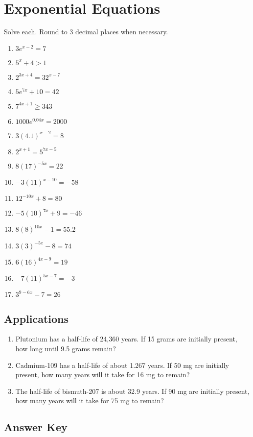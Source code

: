 \chapter{Exponential Equations}

Solve each. Round to 3 decimal places when necessary.
\begin{multicols}{2}
\begin{enumerate}
	\item $3e^{x-2} = 7$
	\item $5^x + 4 > 1$
	\item $2^{3x+4} = 32^{x-7}$
	\item $5e^{7x} + 10 = 42$
	\item $7^{4x+1} \geq 343$
	\item $1000e^{0.04x} = 2000$
	\item $3(4.1)^{x-2} = 8$
	\item $2^{x+1} = 5^{7x-5}$
	\item $8(17)^{-5x} = 22$
	\item $-3(11)^{x-10} = -58$
	\item $12^{-10x}+8=80$
	\item $-5(10)^{7x}+9 = -46$
	\item $8(8)^{10x}-1 = 55.2$
	\item $3(3)^{-5x}-8=74$
	\item $6(16)^{4x-9} = 19$
	\item $-7(11)^{5x-7}=-3$
	\item $3^{9-6x}-7 = 26$
\end{enumerate}
\end{multicols}

\section{Applications}
\begin{enumerate}
	\item Plutonium has a half-life of 24,360 years. If 15 grams are initially present, how long until 9.5 grams remain?
	\item Cadmium-109 has a half-life of about 1.267 years. If 50 mg are initially present, how many years will it take for 16 mg to remain?
    \item The half-life of bismuth-207 is about 32.9 years. If 90 mg are initially present, how many years will it take for 75 mg to remain?
\end{enumerate}

\newpage

\section{Answer Key}


